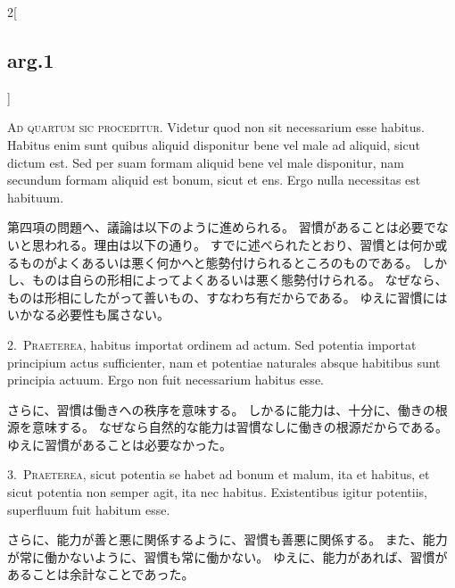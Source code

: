 \documentclass[paper=a4paper,fontsize=10pt,jafontsize=9pt,titlepage]{jlreq}
\begin{document}
\begin{paracol}{2}[\subsection{arg.1}]

{\scshape Ad quartum sic proceditur}. Videtur quod non sit necessarium esse
 habitus. Habitus enim sunt quibus aliquid disponitur bene vel male ad
 aliquid, sicut dictum est. Sed per suam formam aliquid bene vel male
 disponitur, nam secundum formam aliquid est bonum, sicut et ens. Ergo
 nulla necessitas est habituum.

\switchcolumn

第四項の問題へ、議論は以下のように進められる。
習慣があることは必要でないと思われる。理由は以下の通り。
すでに述べられたとおり、習慣とは何か或るものがよくあるいは悪く何かへと態勢付けられるところのものである。
しかし、ものは自らの形相によってよくあるいは悪く態勢付けられる。
なぜなら、ものは形相にしたがって善いもの、すなわち有だからである。
ゆえに習慣にはいかなる必要性も属さない。


2.~{\scshape Praeterea}, habitus importat ordinem ad actum. Sed potentia importat
 principium actus sufficienter, nam et potentiae naturales absque
 habitibus sunt principia actuum. Ergo non fuit necessarium habitus
 esse.

\switchcolumn

さらに、習慣は働きへの秩序を意味する。
しかるに能力は、十分に、働きの根源を意味する。
なぜなら自然的な能力は習慣なしに働きの根源だからである。
ゆえに習慣があることは必要なかった。


3.~{\scshape Praeterea}, sicut potentia se habet ad bonum et malum, ita et habitus,
 et sicut potentia non semper agit, ita nec habitus. Existentibus
 igitur potentiis, superfluum fuit habitum esse.

\switchcolumn

さらに、能力が善と悪に関係するように、習慣も善悪に関係する。
また、能力が常に働かないように、習慣も常に働かない。
ゆえに、能力があれば、習慣があることは余計なことであった。


\end{paracol}
\end{document}
